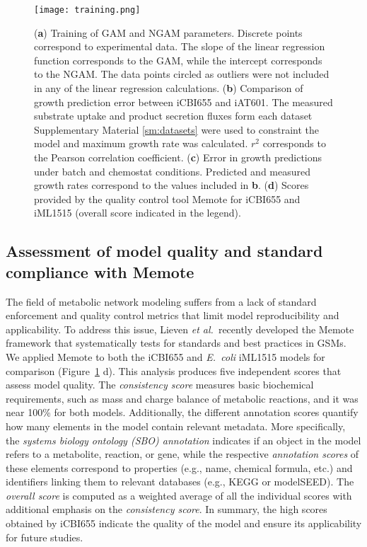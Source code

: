 \begin{figure}[hp]
    \centering
    \texttt{[image: training.png]}
    \caption[Training of iCBI655 model]{%
        (\textbf{a}) Training of GAM and NGAM parameters. Discrete points correspond to experimental data.
    The slope of the linear regression function corresponds to the GAM, while the intercept corresponds to the NGAM.
    The data points circled as outliers were not included in any of the linear regression calculations. (\textbf{b}) Comparison of growth prediction error between iCBI655 and iAT601.
    The measured substrate uptake and product secretion fluxes form each dataset Supplementary Material \ref{sm:datasets} were used to constraint the model and maximum growth rate was calculated.
    $r^2$ corresponds to the Pearson correlation coefficient.
    (\textbf{c}) Error in growth predictions under batch and chemostat conditions.
    Predicted and measured growth rates correspond to the values included in \textbf{b}. (\textbf{d}) Scores provided by the quality control tool Memote\citep{lieven2018} for iCBI655 and iML1515 (overall score indicated in the legend).}
   \label{fig6:training}
\end{figure}

\subsection{Assessment of model quality and standard compliance with Memote}
The field of metabolic network modeling suffers from a lack of standard enforcement and quality control metrics that limit model reproducibility and applicability.
To address this issue, Lieven \textit{et al.}\ recently developed the Memote framework that systematically tests for standards and best practices in GSMs. \citep{lieven2018}
We applied Memote to both the iCBI655 and \textit{E.~coli} iML1515 models for comparison (Figure~\ref{fig6:training} d). This analysis produces five independent scores that assess model quality.
The \emph{consistency score}  measures basic biochemical requirements, such as mass and charge balance of metabolic reactions, and it was near 100\% for both models.
Additionally, the different annotation scores quantify how many elements in the model contain relevant metadata. More specifically, the \emph{systems biology ontology (SBO) annotation} indicates if an object in the model refers to a metabolite, reaction, or gene, while the respective \emph{annotation scores} of these elements correspond to properties (e.g., name, chemical formula, etc.) and identifiers linking them to relevant databases (e.g., KEGG\citep{kanehisa2000} or modelSEED\citep{henry2010}). The \emph{overall score} is computed as a weighted average of all the individual scores with additional emphasis on the \emph{consistency score}.
In summary, the high scores obtained by iCBI655 indicate the quality of the model and ensure its applicability for future studies.


